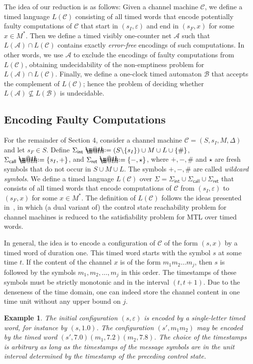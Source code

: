 \documentclass{CSML}
\makeatletter
\theoremstyle{plain}\newtheorem{theorem}[thm]{Theorem}
\theoremstyle{plain}\newtheorem{corollary}[thm]{Corollary}
\theoremstyle{plain}\newtheorem{example}[thm]{Example}
\theoremstyle{plain}\newtheorem{lemma}[thm]{Lemma}
\theoremstyle{plain}\newtheorem{remark}[thm]{Remark}
\newcommand{\B}{\mathcal{B}}
\newcommand{\A}{\mathcal{A}}
\newcommand{\cm}{\mathcal{C}}
\newcommand*{\defeq}{\mathrel{\rlap{\raisebox{0.3ex}{$\m@th\cdot$}}\raisebox{-0.3ex}{$\m@th\cdot$}}=}
\makeatother
\begin{document}
The idea of our reduction is as follows: 
Given a channel machine $\cm$, we define a timed language $L(\cm)$ consisting of all timed words that encode potentially faulty computations of $\cm$ that start in $(s_I,\varepsilon)$ and end in $(s_F,x)$ for some $x\in M^*$. 
Then we define a timed visibly one-counter net $\A$ such that $L(\A)\cap L(\cm)$ contains exactly \emph{error-free} encodings of such computations. In other words, we use $\A$ to exclude the encodings of faulty computations from $L(\cm)$, 
obtaining undecidability of the non-emptiness problem for $L(\A)\cap L(\cm)$. 
Finally, we define a one-clock timed automaton $\B$ that accepts the complement of $L(\cm)$; hence the problem of deciding whether $L(\A)\not\subseteq L(\B)$ is undecidable. 


\subsection{Encoding Faulty Computations}
For the remainder of Section 4, consider a channel machine 
$\cm=(S,s_I,M,\Delta)$ and let $s_F\in S$. 
Define 
$\Sigma_{\mathsf{int}} \defeq (S \backslash\{s_I\}) \cup M \cup L\cup \{\#\}$,
$\Sigma_{\mathsf{call}} \defeq \{s_I,+\}$,
and $\Sigma_{\mathsf{ret}}\defeq\{-,\star\}$,
where $+,-,\#$ and $\star$ are fresh symbols that do not occur in $S\cup M\cup L$. The symbols $+,-,\#$ are called \emph{wildcard symbols}. 
We define a timed language $L(\cm)$ over $\Sigma=\Sigma_{\mathsf{int}}\cup\Sigma_{\mathsf{call}}\cup\Sigma_{\mathsf{ret}}$ that consists of all timed words that encode computations of $\cm$ from $(s_I,\varepsilon)$ to $(s_F,x)$ for some $x\in M^*$. 
The definition of $L(\cm)$ follows the ideas presented in~\cite{DBLP:conf/lics/OuaknineW05}, in which (a dual variant of) the 
control state reachability problem for channel machines is reduced to the satisfiability problem for MTL over timed words.


In general, the idea is to encode a configuration of $\cm$ of the form $(s, x)$ by a timed word of duration one. 
This timed word starts with the symbol $s$ at some time $t$.
If the content of the channel $x$ is of the form $m_1 m_2 \dots m_j$, 
then $s$ is followed by the symbols $m_1, m_2,\dots,m_j$ in this order. The timestamps of these symbols must be strictly monotonic and in the interval $(t,t+1)$. 
Due to the denseness of the time domain, one can indeed store the channel content in one time unit without any upper bound on $j$.


\begin{example}
	The initial configuration $(s,\varepsilon)$ is encoded by a
        single-letter timed word, for instance by $(s,1.0)$. 
The configuration $(s',m_1m_2)$ may be encoded by the timed word $(s',7.0)(m_1,7.2)(m_2,7.8)$. 
The choice of the timestamps is arbitrary as long as the timestamps of the message symbols are in the unit interval determined by the timestamp of the preceding control state. 
\end{example}
\end{document}
